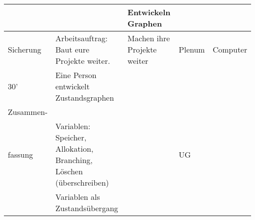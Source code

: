 \documentclass{article}
\begin{document}
\begin{tabularx}{\textwidth}{|X|X|X|X|X|}
                              &                                                                            & Entwickeln Graphen                    &                                                                                          &                                                                             \\ \hline
Sicherung                     & Arbeitsauftrag: Baut eure Projekte weiter.                                 & Machen ihre Projekte weiter           & Plenum                                                                                   & Computer                                                                    \\
30'                           & Eine Person entwickelt Zustandsgraphen                                     &                                       &                                                                                          &                                                                             \\ \hline
Zusammen-\\fassung               & Variablen: Speicher, Allokation, Branching, Löschen (überschreiben)        &                                       & UG                                                                                       &                                                                             \\
                              & Variablen als Zustandsübergang                                             &                                       &                                                                                          &                                                                             \\ \hline
\end{tabularx}
\end{document}
